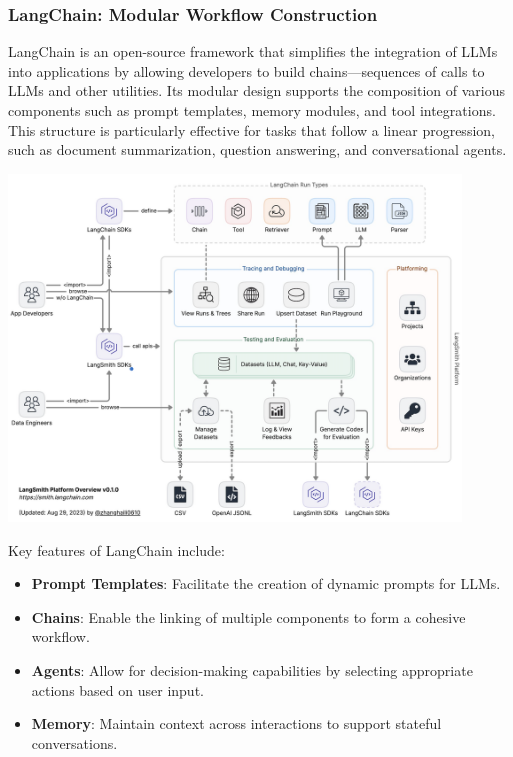 \subsubsection{LangChain: Modular Workflow Construction}
LangChain is an open-source framework that simplifies the integration of LLMs into applications by allowing developers to build chains—sequences of calls to LLMs and other utilities. Its modular design supports the composition of various components such as prompt templates, memory modules, and tool integrations. This structure is particularly effective for tasks that follow a linear progression, such as document summarization, question answering, and conversational agents.

\begin{center}
    \centering
    \includegraphics[width=0.9\textwidth]{Images/Langchain Architecture.png}
     \cite{langchainArchitecture}
    \label{fig:langchain_architecture}
\end{center}

Key features of LangChain include:
\begin{itemize}
    \item \textbf{Prompt Templates}: Facilitate the creation of dynamic prompts for LLMs.
    \item \textbf{Chains}: Enable the linking of multiple components to form a cohesive workflow.
    \item \textbf{Agents}: Allow for decision-making capabilities by selecting appropriate actions based on user input.
    \item \textbf{Memory}: Maintain context across interactions to support stateful conversations.
\end{itemize}

